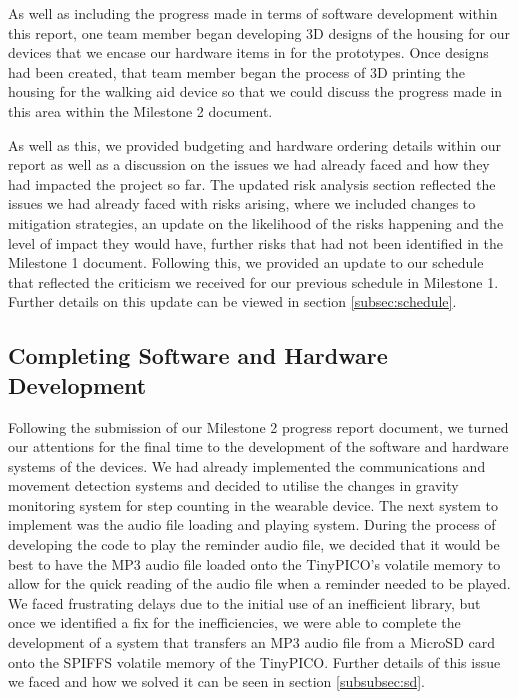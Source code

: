             As well as including the progress made in terms of software development within this report, one team member began developing 3D designs of the housing for our devices that we encase our hardware items in for the prototypes. Once designs had been created, that team member began the process of 3D printing the housing for the walking aid device so that we could discuss the progress made in this area within the Milestone 2 document. 
            
            As well as this, we provided budgeting and hardware ordering details within our report as well as a discussion on the issues we had already faced and how they had impacted the project so far. The updated risk analysis section reflected the issues we had already faced with risks arising, where we included changes to mitigation strategies, an update on the likelihood of the risks happening and the level of impact they would have, further risks that had not been identified in the Milestone 1 document. Following this, we provided an update to our schedule that reflected the criticism we received for our previous schedule in Milestone 1. Further details on this update can be viewed in section \ref{subsec:schedule}.

        \subsection{Completing Software and Hardware Development}

            Following the submission of our Milestone 2 progress report document, we turned our attentions for the final time to the development of the software and hardware systems of the devices. We had already implemented the communications and movement detection systems and decided to utilise the changes in gravity monitoring system for step counting in the wearable device. The next system to implement was the audio file loading and playing system. During the process of developing the code to play the reminder audio file, we decided that it would be best to have the MP3 audio file loaded onto the TinyPICO's volatile memory to allow for the quick reading of the audio file when a reminder needed to be played. We faced frustrating delays due to the initial use of an inefficient library, but once we identified a fix for the inefficiencies, we were able to complete the development of a system that transfers an MP3 audio file from a MicroSD card onto the SPIFFS volatile memory of the TinyPICO. Further details of this issue we faced and how we solved it can be seen in section \ref{subsubsec:sd}.

